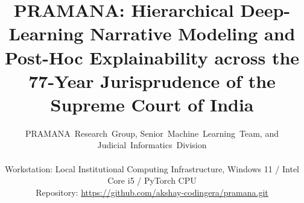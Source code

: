 \documentclass[journal,10pt,twocolumn]{IEEEtran}
\begin{document}
\title{PRAMANA: Hierarchical Deep-Learning Narrative Modeling and Post-Hoc Explainability across the 77-Year Jurisprudence of the Supreme Court of India}

\author{PRAMANA~Research~Group, Senior~Machine~Learning~Team, and Judicial~Informatics~Division\\
\\
Workstation: Local Institutional Computing Infrastructure, Windows 11 / Intel Core i5 / PyTorch CPU\\
Repository: \url{https://github.com/akshay-codingera/pramana.git}
}

\maketitle
\end{document}
